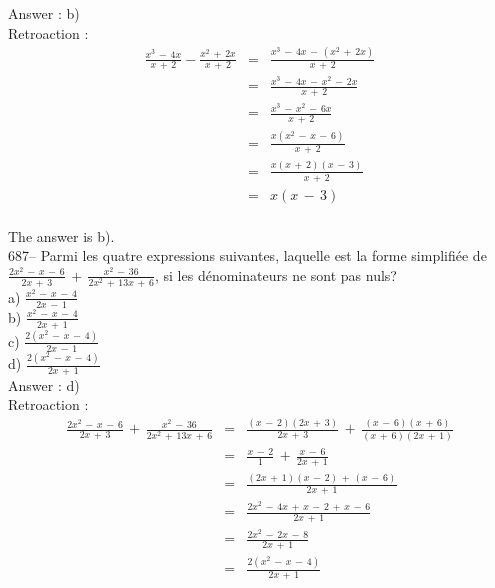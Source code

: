 ﻿\documentclass[letterpaper, 12pt]{article}
\begin{document}
Answer : b)\\

Retroaction : \\
\begin{eqnarray*}
\frac{x^{3}\,-\,4x}{x\,+\,2}-\frac{x^{2}\,+\,2x}{x\,+\,2}&=&\frac{x^{3}\,-\,4x\,-\,(x^{2}\,+\,2x)}{x\,+\,2}\\[2mm]
&=&\frac{x^{3}\,-\,4x\,-\,x^{2}\,-\,2x}{x\,+\,2}\\[2mm]
&=&\frac{x^{3}\,-\,x^{2}\,-\,6x}{x\,+\,2}\\[2mm]
&=&\frac{x(x^{2}\,-\,x\,-\,6)}{x\,+\,2}\\[2mm]
&=&\frac{x(x\,+\,2)(x\,-\,3)}{x\,+\,2}\\[2mm]
&=&x(x\,-\,3)\\
\end{eqnarray*}

The answer is b).\\

687-- Parmi les quatre expressions suivantes, laquelle est la forme
simplifi\'ee de
$\frac{2x^{2}\,-\,x\,-\,6}{2x\,+\,3}\,+\,\frac{x^{2}\,-\,36}{2x^{2}\,+\,13x\,+\,6}$,
si les d\'enominateurs ne sont pas nuls?\\
a) $\frac{x^{2}\,-\,x\,-\,4}{2x\,-\,1}$\\[2mm]
b) $\frac{x^{2}\,-\,x\,-\,4}{2x\,+\,1}$\\[2mm]
c) $\frac{2(x^{2}\,-\,x\,-\,4)}{2x\,-\,1}$\\[2mm]
d) $\frac{2(x^{2}\,-\,x\,-\,4)}{2x\,+\,1}$\\[2mm]

Answer : d)\\

Retroaction : \\
\begin{eqnarray*}
\frac{2x^{2}\,-\,x\,-\,6}{2x\,+\,3}\,+\,\frac{x^{2}\,-\,36}{2x^{2}\,+\,13x\,+\,6}&=&\frac{(x\,-\,2)(2x\,+\,3)}{2x\,+\,3}\,+\,\frac{(x\,-\,6)(x\,+\,6)}{(x\,+\,6)(2x\,+\,1)}\\[2mm]
&=&\frac{x\,-\,2}{1}\,+\,\frac{x\,-\,6}{2x\,+\,1}\\[2mm]
&=&\frac{(2x\,+\,1)(x\,-\,2)\,+\,(x\,-\,6)}{2x\,+\,1}\\[2mm]
&=&\frac{2x^{2}\,-\,4x\,+\,x\,-\,2\,+\,x\,-\,6}{2x\,+\,1}\\[2mm]
&=&\frac{2x^{2}\,-\,2x\,-\,8}{2x\,+\,1}\\[2mm]
&=&\frac{2(x^{2}\,-\,x\,-\,4)}{2x\,+\,1}\\
\end{eqnarray*}
\end{document}
